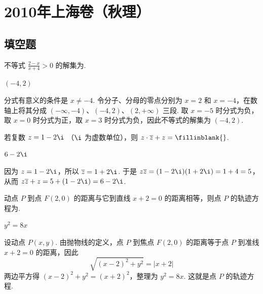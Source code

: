 \chapter{2010年上海卷（秋理）}

\section{填空题}

\begin{problem}
不等式 \(\frac{2 - x}{x + 4} > 0\) 的解集为\fillinblank{}.
\end{problem}

\begin{answer}
\((-4,2)\)
\end{answer}

\begin{solution}
分式有意义的条件是 \(x\neq-4\). 令分子、分母的零点分别为 \(x=2\) 和 \(x=-4\)，在数轴上将其分成 \((-\infty,-4)\)、\((-4,2)\)、\((2,+\infty)\) 三段. 取 \(x=-5\) 时分式为负，取 \(x=0\) 时分式为正，取 \(x=3\) 时分式为负，因此不等式的解集为 \((-4,2)\).
\end{solution}

\begin{problem}
若复数 \(z = 1 - 2\i\) （\(\i\) 为虚数单位），则 \(z \cdot \overline{z} + z =\fillinblank{}\).
\end{problem}

\begin{answer}
\(6-2\i\)
\end{answer}

\begin{solution}
因为 \(z=1-2\i\)，所以 \(\overline{z}=1+2\i\). 于是 \(z\overline{z}=(1-2\i)(1+2\i)=1+4=5\)，从而 \(z\overline{z}+z=5+(1-2\i)=6-2\i\).
\end{solution}

\begin{problem}
动点 \(P\) 到点 \(F(2,0)\) 的距离与它到直线 \(x + 2 = 0\) 的距离相等，则点 \(P\) 的轨迹方程为\fillinblank{}.
\end{problem}

\begin{answer}
\(y^2=8x\)
\end{answer}

\begin{solution}
设动点 \(P(x,y)\). 由抛物线的定义，点 \(P\) 到焦点 \(F(2,0)\) 的距离等于点 \(P\) 到准线 \(x+2=0\) 的距离，因此
\[
\sqrt{(x-2)^2+y^2}=|x+2|
\]
两边平方得 \((x-2)^2+y^2=(x+2)^2\)，整理为 \(y^2=8x\). 这就是点 \(P\) 的轨迹方程.
\end{solution}


